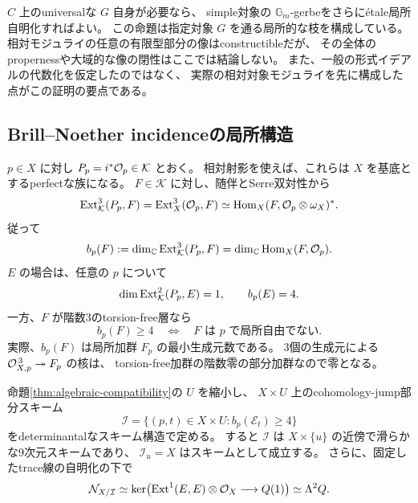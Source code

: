 $C$ 上のuniversalな $G$ 自身が必要なら、
simple対象の $\mathbb G_m$-gerbeをさらに\'etale局所自明化すればよい。
この命題は指定対象 $G$ を通る局所的な枝を構成している。
相対モジュライの任意の有限型部分の像はconstructibleだが、
その全体のpropernessや大域的な像の閉性はここでは結論しない。
また、一般の形式イデアルの代数化を仮定したのではなく、
実際の相対対象モジュライを先に構成した点がこの証明の要点である。

\subsection{Brill--Noether incidenceの局所構造}

$p\in X$ に対し $P_p=i^*\mathcal O_p\in\mathcal K$ とおく。
相対射影を使えば、これらは $X$ を基底とするperfectな族になる。
$F\in\mathcal K$ に対し、随伴とSerre双対性から
\[
 \operatorname{Ext}^3_{\mathcal K}(P_p,F)=\operatorname{Ext}^3_X(\mathcal O_p,F)
 \simeq\operatorname{Hom}_X(F,\mathcal O_p\otimes\omega_X)^*.
\]
従って
\[
 b_p(F):=\dim_\mathbb C\operatorname{Ext}^3_{\mathcal K}(P_p,F)
       =\dim_\mathbb C\operatorname{Hom}_X(F,\mathcal O_p).
\]
$E$ の場合は、任意の $p$ について
\[
 \dim\operatorname{Ext}^2_{\mathcal K}(P_p,E)=1,\qquad b_p(E)=4.
\]
一方、$F$ が階数3のtorsion-free層なら
\[
 b_p(F)\ge4
 \quad\Longleftrightarrow\quad
 F\text{ は }p\text{ で局所自由でない}.
 \tag{BN}\label{eq:bn-nonfree}
\]
実際、$b_p(F)$ は局所加群 $F_p$ の最小生成元数である。
3個の生成元による $\mathcal O_{X,p}^{\,3}\twoheadrightarrow F_p$ の核は、
torsion-free加群の階数零の部分加群なので零となる。

\begin{theorem}[滑らかなincidenceとその法束]\label{thm:bn-incidence}
命題\ref{thm:algebraic-compatibility}の $U$ を縮小し、
$X\times U$ 上のcohomology-jump部分スキーム
\[
 \mathcal I
   =\{(p,t)\in X\times U:b_p(\mathcal E_t)\ge4\}
\]
をdeterminantalなスキーム構造で定める。
すると $\mathcal I$ は $X\times\{u\}$ の近傍で滑らかな9次元スキームであり、
$\mathcal I_u=X$ はスキームとして成立する。
さらに、固定したtrace線の自明化の下で
\[
 \mathcal N_{X/\mathcal I}
 \simeq
 \ker\bigl(\operatorname{Ext}^1(E,E)\otimes\mathcal O_X\longrightarrow Q(1)\bigr)
 \simeq\Lambda^2Q.
\]
\end{theorem}

